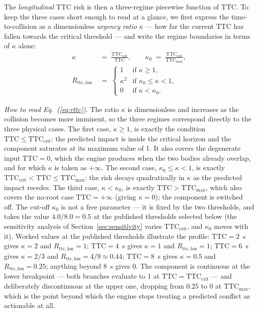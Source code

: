 \documentclass[sn-mathphys-num,Numbered,iicol]{sn-jnl}
\begin{document}
The \emph{longitudinal} TTC risk is then a three-regime piecewise function of $\mathrm{TTC}$. To keep the three cases short enough to read at a glance, we first express the time-to-collision as a dimensionless \emph{urgency ratio} $\kappa$ --- how far the current $\mathrm{TTC}$ has fallen towards the critical threshold --- and write the regime boundaries in terms of $\kappa$ alone:
\begin{equation}
\label{eq:rttc}
\begin{aligned}
  \kappa \;&=\; \frac{\mathrm{TTC}_{\mathrm{crit}}}{\mathrm{TTC}},
  \qquad
  \kappa_0 \;=\; \frac{\mathrm{TTC}_{\mathrm{crit}}}{\mathrm{TTC}_{\max}}, \\[6pt]
  R_{\mathrm{ttc,lon}} \;&=\;
  \begin{cases}
    1          & \text{if } \kappa \ge 1, \\[3pt]
    \kappa^{2} & \text{if } \kappa_0 \le \kappa < 1, \\[3pt]
    0          & \text{if } \kappa < \kappa_0.
  \end{cases}
\end{aligned}
\end{equation}

\medskip\noindent
\emph{How to read Eq.~(\ref{eq:rttc}).} The ratio $\kappa$ is dimensionless and increases as the collision becomes more imminent, so the three regimes correspond directly to the three physical cases. The first case, $\kappa \ge 1$, is exactly the condition $\mathrm{TTC} \le \mathrm{TTC}_{\mathrm{crit}}$: the predicted impact is inside the critical horizon and the component saturates at its maximum value of 1. It also covers the degenerate input $\mathrm{TTC} = 0$, which the engine produces when the two bodies already overlap, and for which $\kappa$ is taken as $+\infty$. The second case, $\kappa_0 \le \kappa < 1$, is exactly $\mathrm{TTC}_{\mathrm{crit}} < \mathrm{TTC} \le \mathrm{TTC}_{\max}$: the risk decays quadratically in $\kappa$ as the predicted impact recedes. The third case, $\kappa < \kappa_0$, is exactly $\mathrm{TTC} > \mathrm{TTC}_{\max}$, which also covers the no-root case $\mathrm{TTC} = +\infty$ (giving $\kappa = 0$); the component is switched off. The cut-off $\kappa_0$ is not a free parameter --- it is fixed by the two thresholds, and takes the value $4.0/8.0 = 0.5$ at the published thresholds selected below (the sensitivity analysis of Section~\ref{sec:sensitivity} varies $\mathrm{TTC}_{\mathrm{crit}}$, and $\kappa_0$ moves with it). Worked values at the published thresholds illustrate the profile: $\mathrm{TTC} = 2$~s gives $\kappa = 2$ and $R_{\mathrm{ttc,lon}} = 1$; $\mathrm{TTC} = 4$~s gives $\kappa = 1$ and $R_{\mathrm{ttc,lon}} = 1$; $\mathrm{TTC} = 6$~s gives $\kappa = 2/3$ and $R_{\mathrm{ttc,lon}} = 4/9 \approx 0.44$; $\mathrm{TTC} = 8$~s gives $\kappa = 0.5$ and $R_{\mathrm{ttc,lon}} = 0.25$; anything beyond 8~s gives 0. The component is continuous at the lower breakpoint --- both branches evaluate to 1 at $\mathrm{TTC} = \mathrm{TTC}_{\mathrm{crit}}$ --- and deliberately discontinuous at the upper one, dropping from $0.25$ to $0$ at $\mathrm{TTC}_{\max}$, which is the point beyond which the engine stops treating a predicted conflict as actionable at all.
\end{document}
